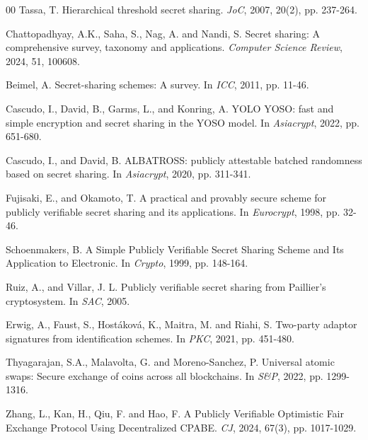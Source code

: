\documentclass[runningheads]{llncs}
\begin{document}
\begin{thebibliography}{00}
 Tassa, T. Hierarchical threshold secret sharing. \textit{JoC}, 2007, 20(2), pp. 237-264.


Chattopadhyay, A.K., Saha, S., Nag, A. and Nandi, S. Secret sharing: A comprehensive survey, taxonomy and applications. \textit{Computer Science Review}, 2024, 51, 100608.


Beimel, A. Secret-sharing schemes: A survey. In \textit{ICC}, 2011, pp. 11-46.




 Cascudo, I., David, B., Garms, L., and Konring, A. YOLO YOSO: fast and simple encryption and secret sharing in the YOSO model. In \textit{Asiacrypt}, 2022, pp. 651-680.

 Cascudo, I., and David, B. ALBATROSS: publicly attestable batched randomness based on secret sharing. In \textit{Asiacrypt}, 2020, pp. 311-341.


 Fujisaki, E., and Okamoto, T. A practical and provably secure scheme for publicly verifiable secret sharing and its applications. In \textit{Eurocrypt}, 1998, pp. 32-46.

 Schoenmakers, B. A Simple Publicly Verifiable Secret Sharing Scheme and Its Application to Electronic. In \textit{Crypto}, 1999, pp. 148-164.


 Ruiz, A., and Villar, J. L. Publicly verifiable secret sharing from Paillier's cryptosystem. In \textit{SAC}, 2005.


Erwig, A., Faust, S., Hostáková, K., Maitra, M. and Riahi, S. Two-party adaptor signatures from identification schemes. In \textit{PKC}, 2021, pp. 451-480.

Thyagarajan, S.A., Malavolta, G. and Moreno-Sanchez, P. Universal atomic swaps: Secure exchange of coins across all blockchains. In \textit{S\&P}, 2022, pp. 1299-1316.

Zhang, L., Kan, H., Qiu, F. and Hao, F. A Publicly Verifiable Optimistic Fair Exchange Protocol Using Decentralized CPABE. \textit{CJ}, 2024, 67(3), pp. 1017-1029.



\end{thebibliography}
\end{document}
